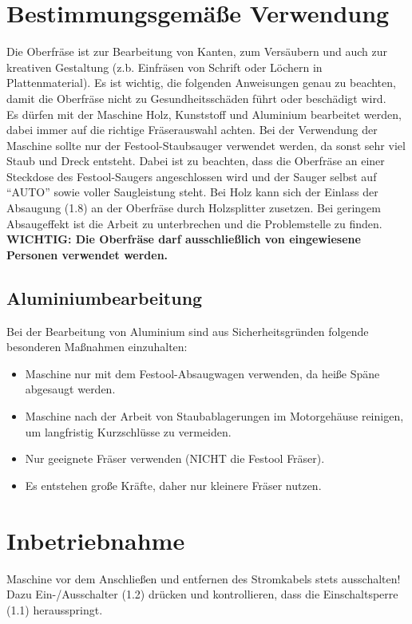 \documentclass{\basedir/fablab-document}
\begin{document}
\section{Bestimmungsgemäße Verwendung}
Die Oberfräse ist zur Bearbeitung von Kanten, zum Versäubern und auch zur kreativen Gestaltung (z.b. Einfräsen von Schrift oder Löchern in Plattenmaterial). Es ist wichtig, die folgenden Anweisungen genau zu beachten, damit die Oberfräse nicht zu Gesundheitsschäden führt oder beschädigt wird.\\
Es dürfen mit der Maschine Holz, Kunststoff und Aluminium bearbeitet werden, dabei immer auf die richtige Fräserauswahl achten. Bei der Verwendung der Maschine sollte nur der Festool-Staubsauger verwendet werden, da sonst sehr viel Staub und Dreck entsteht. Dabei ist zu beachten, dass die Oberfräse an einer Steckdose des Festool-Saugers angeschlossen wird und der Sauger selbst auf \enquote{AUTO} sowie voller Saugleistung steht. Bei Holz kann sich der Einlass der Absaugung (1.8) an der Oberfräse durch Holzsplitter zusetzen. Bei geringem Absaugeffekt ist die Arbeit zu unterbrechen und die Problemstelle zu finden.\\
\textbf{WICHTIG: Die Oberfräse darf ausschließlich von eingewiesene Personen verwendet werden.}


\subsection{Aluminiumbearbeitung}
Bei der Bearbeitung von Aluminium sind aus Sicherheitsgründen folgende besonderen Maßnahmen einzuhalten:
\begin{itemize}
\item Maschine nur mit dem Festool-Absaugwagen verwenden, da heiße Späne abgesaugt werden.
\item Maschine nach der Arbeit von Staubablagerungen im Motorgehäuse reinigen, um langfristig Kurzschlüsse zu vermeiden.
\item Nur geeignete Fräser verwenden (NICHT die Festool Fräser).
\item Es entstehen große Kräfte, daher nur kleinere Fräser nutzen.
\end{itemize}


\section{Inbetriebnahme}
Maschine vor dem Anschließen und entfernen des Stromkabels stets ausschalten! Dazu Ein-/Ausschalter (1.2) drücken und kontrollieren, dass die Einschaltsperre (1.1) herausspringt.
\end{document}
